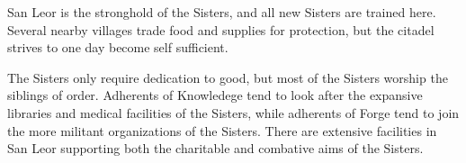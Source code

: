San Leor is the stronghold of the Sisters, and all new Sisters are trained here.
Several nearby villages trade food and supplies for protection, but the citadel strives to one day become self sufficient.

The Sisters only require dedication to good, but most of the Sisters worship the siblings of order.
Adherents of Knowledege tend to look after the expansive libraries and medical facilities of the Sisters, while adherents of Forge tend to join the more militant organizations of the Sisters.
There are extensive facilities in San Leor supporting both the charitable and combative aims of the Sisters.
